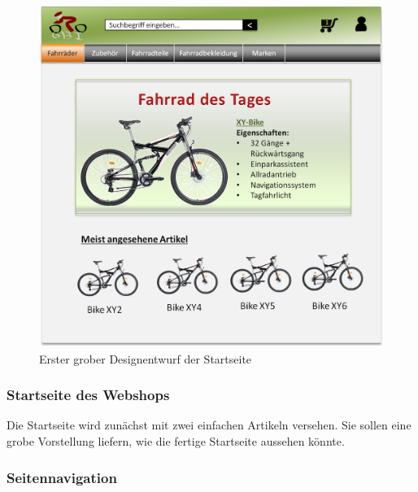 \begin{figure}[H]
\begin{center}
\includegraphics[width=150mm]{Bilder/Abbildung2-GroberDesignEntwurfDesWebshops.png}
\end{center}
\caption{Erster grober Designentwurf der Startseite}
\label{Abbildung2-Erster grober Designentwurf der Startseite}
\end{figure}

\subsubsection{Startseite des Webshops}

Die Startseite wird zunächst mit zwei einfachen Artikeln versehen. Sie sollen eine grobe Vorstellung liefern, wie die fertige Startseite aussehen könnte.

\subsubsection{Seitennavigation}

